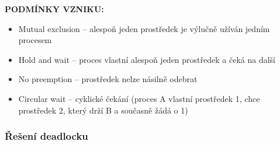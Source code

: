 \documentclass[10pt,a4paper]{article}
\begin{document}
\textbf{PODMÍNKY VZNIKU:}
\begin{itemize}
	\item Mutual exclusion – alespoň jeden prostředek je výlučně užíván jedním procesem
	\item Hold and wait – proces vlastní alespoň jeden prostředek a čeká na další
	\item No preemption – prostředek nelze násilně odebrat
	\item Circular wait – cyklické čekání (proces A vlastní prostředek 1, chce prostředek 2, který drží B a současně žádá o 1)
\end{itemize}

\subsubsection{Řešení deadlocku}
\end{document}
